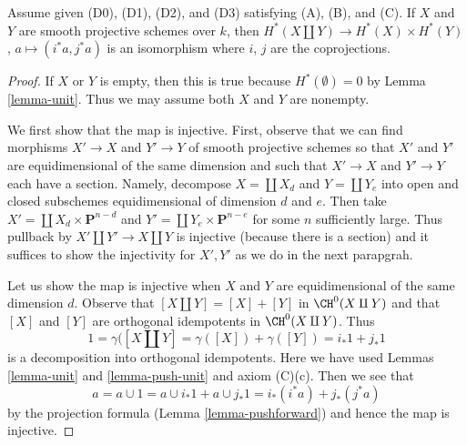 \begin{lemma}
\label{lemma-weil-additive}
Assume given (D0), (D1), (D2), and (D3) satisfying (A), (B), and (C).
If $X$ and $Y$ are smooth projective schemes over $k$, then
$H^*(X \amalg Y) \to H^*(X) \times H^*(Y)$,
$a \mapsto (i^*a, j^*a)$ is an isomorphism where $i$, $j$
are the coprojections.
\end{lemma}

\begin{proof}
If $X$ or $Y$ is empty, then this is true because
$H^*(\emptyset) = 0$ by Lemma \ref{lemma-unit}.
Thus we may assume both $X$ and $Y$ are nonempty.

\medskip\noindent
We first show that the map is injective. First, observe that
we can find morphisms $X' \to X$ and $Y' \to Y$
of smooth projective schemes so that $X'$ and $Y'$ are
equidimensional of the same dimension and such that
$X' \to X$ and $Y' \to Y$ each have a section. Namely,
decompose $X = \coprod X_d$ and $Y = \coprod Y_e$
into open and closed subschemes equidimensional of
dimension $d$ and $e$. Then take
$X' = \coprod X_d \times \mathbf{P}^{n - d}$
and $Y' = \coprod Y_e \times \mathbf{P}^{n - e}$ for some
$n$ sufficiently large. Thus pullback by
$X' \amalg Y' \to X \amalg Y$ is injective
(because there is a section) and
it suffices to show the injectivity for $X', Y'$
as we do in the next parapgrah.

\medskip\noindent
Let us show the map is injective when $X$ and $Y$ are equidimensional
of the same dimension $d$.
Observe that $[X \amalg Y] = [X] + [Y]$ in $\CH^0(X \amalg Y)$
and that $[X]$ and $[Y]$ are orthogonal idempotents in $\CH^0(X \amalg Y)$.
Thus
$$
1 = \gamma([X \amalg Y] = \gamma([X]) + \gamma([Y]) = i_*1 + j_*1
$$
is a decomposition into orthogonal idempotents. Here we have used
Lemmas \ref{lemma-unit} and \ref{lemma-push-unit} and axiom (C)(c).
Then we see that
$$
a = a \cup 1 = a \cup i_*1 + a \cup j_*1 =
i_*(i^*a) + j_*(j^*a)
$$
by the projection formula (Lemma \ref{lemma-pushforward}) and hence the map
is injective.


\end{proof}
